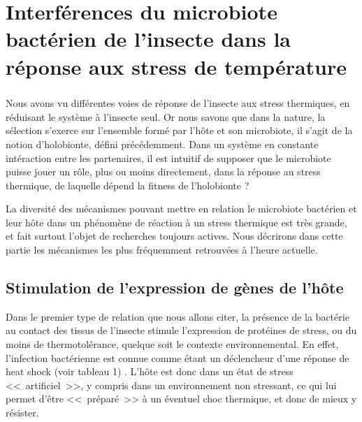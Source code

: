 \chapter{Interférences du microbiote bactérien de l'insecte dans la réponse aux stress de température} %

\paragraph*{}
Nous avons vu différentes voies de réponse de l'insecte aux stress thermiques, en réduisant le système à l'insecte seul.
Or nous savons que dans la nature, la sélection s'exerce sur l'ensemble formé par l'hôte et son microbiote, il s'agit de la notion d'holobionte, défini précédemment.
Dans un système en constante intéraction entre les partenaires, il est intuitif de supposer que le microbiote puisse jouer un rôle, plus ou moins directement, dans la réponse au stress thermique, de laquelle dépend la fitness de l'holobionte ?

La diversité des mécanismes pouvant mettre en relation le microbiote bactérien et leur hôte dans un phénomène de réaction à un stress thermique est très grande, et fait surtout l'objet de recherches toujours actives.
Nous décrirons dans cette partie les mécanismes les plus fréquemment retrouvées à l'heure actuelle.

\section{Stimulation de l'expression de gènes de l'hôte}

Dans le premier type de relation que nous allons citer, la présence de la bactérie au contact des tissus de l'insecte stimule l'expression de protéines de stress, ou du moins de thermotolérance, quelque soit le contexte environnemental.
En effet, l'infection bactérienne est connue comme étant un déclencheur d'une réponse de heat shock (voir tableau 1) \cite{deitch1995}.
L'hôte est donc dans un état de stress <<~artificiel~>>, y compris dans un environnement non stressant, ce qui lui permet d'être <<~préparé~>> à un éventuel choc thermique, et donc de mieux y résister.

